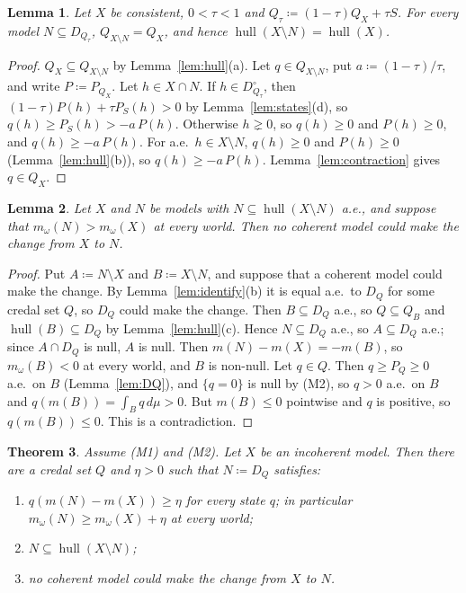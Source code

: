 \documentclass[11pt]{article}
\newcommand{\hull}{\operatorname{hull}}
\theoremstyle{plain}
\newtheorem{theorem}{Theorem}[section]
\newtheorem{lemma}[theorem]{Lemma}
\theoremstyle{definition}
\begin{document}
\begin{lemma}\label{lem:trim}
Let $X$ be consistent, $0<\tau<1$ and $Q_\tau\coloneqq(1-\tau)Q_X+\tau S$. For every model
$N\subseteq D_{Q_\tau}$, $Q_{X\setminus N}=Q_X$, and hence $\hull(X\setminus N)=\hull(X)$.
\end{lemma}

\begin{proof}
$Q_X\subseteq Q_{X\setminus N}$ by Lemma~\ref{lem:hull}(a). Let $q\in Q_{X\setminus N}$, put
$a\coloneqq(1-\tau)/\tau$, and write $P\coloneqq P_{Q_X}$. Let $h\in X\cap N$. If $h\in
D^\circ_{Q_\tau}$, then $(1-\tau)P(h)+\tau P_S(h)>0$ by Lemma~\ref{lem:states}(d), so $q(h)\ge
P_S(h)>-a\,P(h)$. Otherwise $h\gneq0$, so $q(h)\ge0$ and $P(h)\ge0$, and $q(h)\ge-a\,P(h)$.
For a.e.\ $h\in X\setminus N$, $q(h)\ge0$ and $P(h)\ge0$ (Lemma~\ref{lem:hull}(b)), so $q(h)\ge-a\,P(h)$.
Lemma~\ref{lem:contraction} gives $q\in Q_X$.
\end{proof}

\begin{lemma}\label{lem:change}
Let $X$ and $N$ be models with $N\subseteq\hull(X\setminus N)$ a.e., and suppose that
$m_\omega(N)>m_\omega(X)$ at every world. Then no coherent model could make the change from $X$
to $N$.
\end{lemma}

\begin{proof}
Put $A\coloneqq N\setminus X$ and $B\coloneqq X\setminus N$, and suppose that a coherent model
could make the change. By Lemma~\ref{lem:identify}(b) it is equal a.e.\ to $D_Q$ for some
credal set $Q$, so $D_Q$ could make the change. Then $B\subseteq D_Q$ a.e., so $Q\subseteq
Q_B$ and $\hull(B)\subseteq D_Q$ by Lemma~\ref{lem:hull}(c). Hence $N\subseteq D_Q$ a.e., so $A\subseteq D_Q$ a.e.; since $A\cap
D_Q$ is null, $A$ is null. Then $m(N)-m(X)=-m(B)$, so $m_\omega(B)<0$ at every world, and $B$
is non-null. Let $q\in Q$. Then $q\ge P_Q\ge0$ a.e.\ on $B$ (Lemma~\ref{lem:DQ}), and
$\{q=0\}$ is null by (M2), so $q>0$ a.e.\ on $B$ and $q(m(B))=\int_Bq\,d\mu>0$. But $m(B)\le0$ pointwise and $q$ is positive, so
$q(m(B))\le0$. This is a contradiction.
\end{proof}

\begin{theorem}\label{thm:repair}
Assume (M1) and (M2). Let $X$ be an incoherent model. Then there are a credal set $Q$ and $\eta>0$ such that
$N\coloneqq D_Q$ satisfies:
\begin{enumerate}[label=(\arabic*)]
  \item $q(m(N)-m(X))\ge\eta$ for every state $q$; in particular $m_\omega(N)\ge
  m_\omega(X)+\eta$ at every world;
  \item $N\subseteq\hull(X\setminus N)$;
  \item no coherent model could make the change from $X$ to $N$.
\end{enumerate}
\end{theorem}
\end{document}
